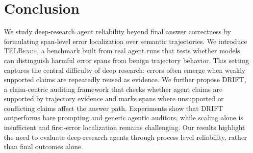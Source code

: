 \section{Conclusion}
We study deep-research agent reliability beyond final answer correctness by formulating span-level error localization over semantic trajectories. We introduce \textsc{TELBench}, a benchmark built from real agent runs that tests whether models can distinguish harmful error spans from benign trajectory behavior. This setting captures the central difficulty of deep research: errors often emerge when weakly supported claims are repeatedly reused as evidence. We further propose \textsc{DRIFT}, a claim-centric auditing framework that checks whether agent claims are supported by trajectory evidence and marks spans where unsupported or conflicting claims affect the answer path. Experiments show that \textsc{DRIFT} outperforms bare prompting and generic agentic auditors, while scaling alone is insufficient and first-error localization remains challenging. Our results highlight the need to evaluate deep-research agents through process level reliability, rather than final outcomes alone.